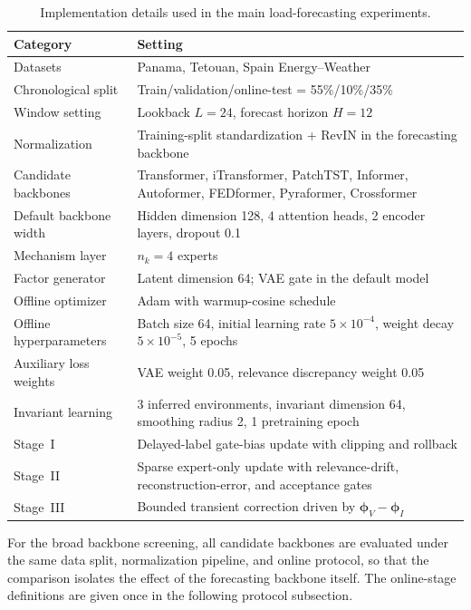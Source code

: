 ﻿\documentclass[journal]{IEEEtran}
\newenvironment{auditproblemblock}{\begingroup\color{red}}{\endgroup}
\begin{document}
\begin{auditproblemblock}
\begin{table}[t]
\caption{Implementation details used in the main load-forecasting experiments.}
\label{tab:impl_details}
\centering
\begin{tabular}{ll}
\toprule
Category & Setting \\
\midrule
Datasets & Panama, Tetouan, Spain Energy--Weather \\
Chronological split & Train/validation/online-test = 55\%/10\%/35\% \\
Window setting & Lookback $L=24$, forecast horizon $H=12$ \\
Normalization & Training-split standardization + RevIN in the forecasting backbone \\
Candidate backbones & Transformer, iTransformer, PatchTST, Informer, Autoformer, FEDformer, Pyraformer, Crossformer \\
Default backbone width & Hidden dimension 128, 4 attention heads, 2 encoder layers, dropout 0.1 \\
Mechanism layer & $n_k=4$ experts \\
Factor generator & Latent dimension 64; VAE gate in the default model \\
Offline optimizer & Adam with warmup-cosine schedule \\
Offline hyperparameters & Batch size 64, initial learning rate $5\times 10^{-4}$, weight decay $5\times 10^{-5}$, 5 epochs \\
Auxiliary loss weights & VAE weight 0.05, relevance discrepancy weight 0.05 \\
Invariant learning & 3 inferred environments, invariant dimension 64, smoothing radius 2, 1 pretraining epoch \\
Stage~I & Delayed-label gate-bias update with clipping and rollback \\
Stage~II & Sparse expert-only update with relevance-drift, reconstruction-error, and acceptance gates \\
Stage~III & Bounded transient correction driven by $\boldsymbol{\phi}_V-\boldsymbol{\phi}_I$ \\
\bottomrule
\end{tabular}
\end{table}

For the broad backbone screening, all candidate backbones are evaluated under the same data split, normalization pipeline, and online protocol, so that the comparison isolates the effect of the forecasting backbone itself. The online-stage definitions are given once in the following protocol subsection.


\end{auditproblemblock}
\end{document}
